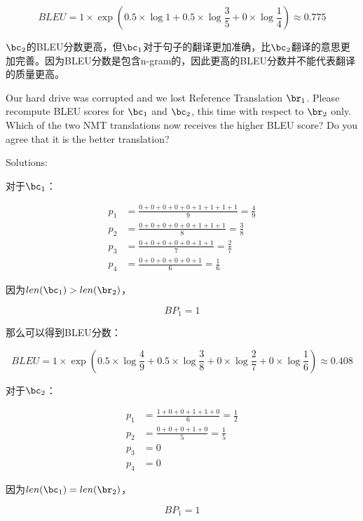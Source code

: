 \begin{parts}
\begin{subparts}
{        $$
            BLEU = 1 \times \exp(0.5 \times \log{1} + 0.5 \times \log{\frac{3}{5}} + 0 \times \log{\frac{1}{4}}) \approx 0.775
        $$

        $\bc_{2}$的BLEU分数更高，但$\bc_{1}$对于句子的翻译更加准确，比$\bc_{2}$翻译的意思更加完善。因为BLEU分数是包含n-gram的，因此更高的BLEU分数并不能代表翻译的质量更高。
        }
        
        \subpart[5] Our hard drive was corrupted and we lost Reference Translation $\br_1$. Please recompute BLEU scores for $\bc_1$ and $\bc_2$, this time with respect to $\br_2$ only. Which of the two NMT translations now receives the higher BLEU score? Do you agree that it is the better translation?
        
        {\color{red}Solutions:
        
        对于$\bc_{1}$：

        \begin{align*}
            p_{1} &= \frac{0 + 0 + 0 + 0 + 0 + 1 + 1 + 1 + 1}{9} = \frac{4}{9} \\
            p_{2} &= \frac{0 + 0 + 0 + 0 + 0 + 1 + 1 + 1}{8} = \frac{3}{8} \\
            p_{3} &= \frac{0 + 0 + 0 + 0 + 0 + 1 + 1}{7} = \frac{2}{7} \\
            p_{4} &= \frac{0 + 0 + 0 + 0 + 0 + 1}{6} = \frac{1}{6}
        \end{align*}

        因为$len(\bc_{1}) > len(\br_{2})$，

        $$
            BP_{1} = 1
        $$

        那么可以得到BLEU分数：

        $$
            BLEU = 1 \times \exp(0.5 \times \log{\frac{4}{9}} + 0.5 \times \log{\frac{3}{8}} + 0 \times \log{\frac{2}{7}} + 0 \times \log{\frac{1}{6}}) \approx 0.408
        $$

        对于$\bc_{2}$：

        \begin{align*}
            p_{1} &= \frac{1 + 0 + 0 + 1 + 1 + 0}{6} = \frac{1}{2} \\
            p_{2} &= \frac{0 + 0 + 0 + 1 + 0}{5} = \frac{1}{5} \\
            p_{3} &= 0 \\
            p_{4} &= 0
        \end{align*}

        因为$len(\bc_{1}) = len(\br_{2})$，

        $$
            BP_{1} = 1
        $$

}
\end{subparts}
\end{parts}
